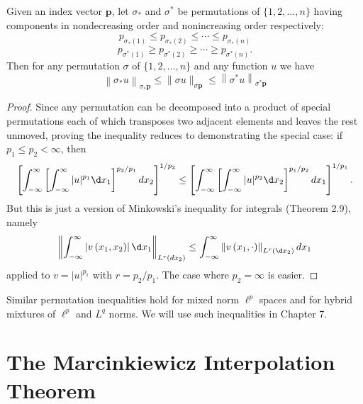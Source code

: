 \begin{theorem}
  Given an index vector $\mathbf{p}$, let $\sigma_*$ and $\sigma^*$ be permutations of $\{1,2, \ldots, n\}$ having components in nondecreasing order and nonincreasing order respectively:
  \[
  p_{\sigma_*(1)} \leq p_{\sigma_*(2)} \leq \cdots \leq p_{\sigma_*(n)}
  \]
  \[
  p_{\sigma^*(1)} \geq p_{\sigma^*(2)} \geq \cdots \geq p_{\sigma^*(n)} .
  \]
  Then for any permutation $\sigma$ of $\{1,2, \ldots, n\}$ and any function $u$ we have
  \[
  \left\|\sigma_* u\right\|_{\sigma_* \mathbf{p}} \leq\|\sigma u\|_{\sigma \mathbf{p}} \leq\left\|\sigma^* u\right\|_{\sigma^* \mathbf{p}}
  \]
\end{theorem}

\begin{proof}
  Since any permutation can be decomposed into a product of special permutations each of which transposes two adjacent elements and leaves the rest unmoved, proving the inequality reduces to demonstrating the special case: if $p_1 \leq p_2<\infty$, then
  \[
  \left[\int_{-\infty}^{\infty}\left[\int_{-\infty}^{\infty}|u|^{p_1} \d x_1\right]^{p_2 / p_1} d x_2\right]^{1 / p_2} \leq\left[\int_{-\infty}^{\infty}\left[\int_{-\infty}^{\infty}|u|^{p_2} \d x_2\right]^{p_1 / p_2} d x_1\right]^{1 / p_1} .
  \]
  But this is just a version of Minkowski's inequality for integrals (Theorem 2.9), namely
  \[
  \left\|\int_{-\infty}^{\infty}\left|v\left(x_1, x_2\right)\right| \d x_1\right\|_{L^r\left(d x_2\right)} \leq \int_{-\infty}^{\infty}\left\|v\left(x_1, \cdot\right)\right\|_{L^r\left( \d x_2\right)} d x_1
  \]
  applied to $v=|u|^{p_1}$ with $r=p_2 / p_1$. The case where $p_2=\infty$ is easier.
\end{proof}


\begin{remark}
  Similar permutation inequalities hold for mixed norm $\ell^p$ spaces and for hybrid mixtures of $\ell^p$ and $L^q$ norms. We will use such inequalities in Chapter 7.
\end{remark}


\section{The Marcinkiewicz Interpolation Theorem}


